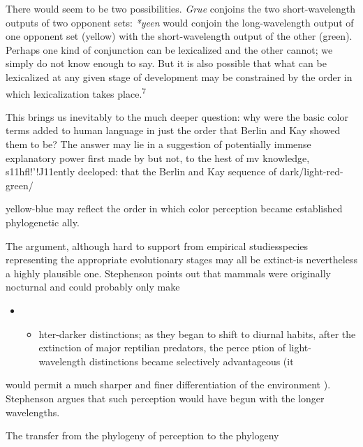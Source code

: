 There would seem to be two possibilities. \textit{Grue }conjoins the two short-wavelength outputs of two opponent sets: \textit{*yeen} would conjoin the long-wavelength output of one opponent set (yellow) with the short-wavelength output of the other (green). Perhaps one kind of conjunction can be lexicalized and the other cannot; we simply do not know enough to say. But it is also possible that what can be lexicalized at any given stage of development may be constrained by the order in which lexicalization takes place.\textsuperscript{7}

This brings us inevitably to the much deeper question: why were the basic color terms added to human language in just the order that Berlin and Kay showed them to be? The answer may lie in a suggestion of potentially immense explanatory power first made by \citet{Stephenson1973} but not, to the hest of mv knowledge, s11hfl!'!J11ently deeloped: that the Berlin and Kay sequence of dark/light-red-green/

yellow-blue may reflect the order in which color perception became established phylogenetic ally.

The argument, although hard to support from empirical studies\-species representing the appropriate evolutionary stages may all be extinct-is nevertheless a highly plausible one. Stephenson points out that mammals were originally nocturnal and could probably only make

\begin{itemize}
\item \begin{itemize}
\item hter-darker distinctions; as they began to shift to diurnal habits, after the extinction of major reptilian predators, the perce ption of light-wavelength distinctions became selectively advantageous (it
\end{itemize}
\end{itemize}

  


 


would permit a much sharper and finer differentiation of the environ\-ment ). Stephenson argues that such perception would have begun with the longer wavelengths.

The transfer from the phylogeny of perception to the phylogeny

